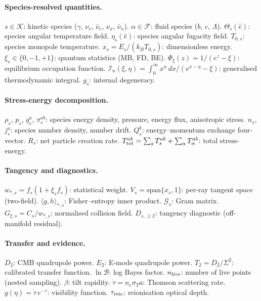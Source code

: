 \paragraph{Species-resolved quantities.}
$s \in \mathcal{K}$: kinetic species ($\gamma$, $\nu_e$,
$\bar{\nu}_e$, $\nu_x$, $\bar{\nu}_x$).
$\alpha \in \mathcal{F}$: fluid species ($b$, $c$,
$\Lambda$).
$\Theta_s(\hat{e})$: species angular temperature field.
$\eta_s(\hat{e})$: species angular fugacity field.
$T_{0,s}$: species monopole temperature.
$x_s = E_s/(k_B T_{0,s})$: dimensionless energy.
$\xi_s \in \{0, -1, +1\}$: quantum statistics (MB, FD, BE).
$\Phi_\xi(z) = 1/(e^z - \xi)$: equilibrium occupation
function.
$\mathcal{I}_n(\xi, \eta) = \int_0^\infty
x^n\,dx/(e^{x-\eta} - \xi)$: generalised thermodynamic
integral.
$g_s$: internal degeneracy.

\paragraph{Stress-energy decomposition.}
$\rho_s$, $p_s$, $q_s^a$, $\pi_s^{ab}$: species energy
density, pressure, energy flux, anisotropic stress.
$n_s$, $j_s^a$: species number density, number drift.
$Q_s^b$: energy--momentum exchange four-vector.
$R_s$: net particle creation rate.
$T^{ab}_{\rm tot} = \sum_s T_s^{ab}
+ \sum_\alpha T_\alpha^{ab}$: total stress-energy.

\paragraph{Tangency and diagnostics.}
$w_{*,s} = f_s(1 + \xi_s f_s)$: statistical weight.
$V_s = \mathrm{span}\{x_s, 1\}$: per-ray tangent space
(two-field).
$\langle g, h \rangle_{*,s}$: Fisher--entropy inner product.
$\mathcal{G}_s$: Gram matrix.
$G_{\xi,s} = C_s / w_{*,s}$: normalised collision field.
$D_{s,\geq 2}$: tangency diagnostic (off-manifold residual).

\paragraph{Transfer and evidence.}
$D_2$: CMB quadrupole power.
$E_2$: E-mode quadrupole power.
$T_2 = D_2/\Sigma^2$: calibrated transfer function.
$\ln \mathcal{B}$: log Bayes factor.
$n_{\rm live}$: number of live points (nested sampling).
$\beta$: tilt rapidity.
$\dot{\tau} = n_e \sigma_T a$: Thomson scattering rate.
$g(\eta) = \dot{\tau}\,e^{-\tau}$: visibility function.
$\tau_{\rm reio}$: reionisation optical depth.


